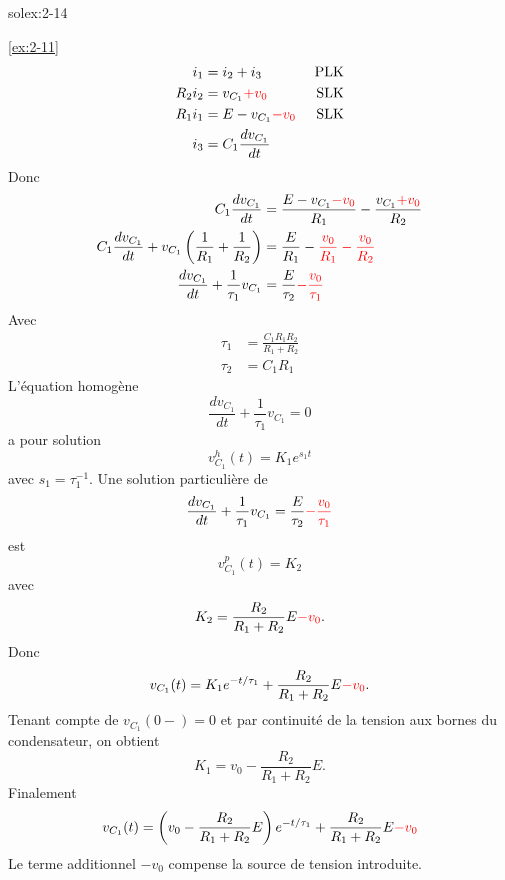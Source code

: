 \begin{exwithsol}{solex:2-14}
\begin{solexercise}{\ref{ex:2-11}}
\begin{align}
i_1 &= i_2 + i_3 &\text{ PLK}\\
R_2 i_2 &= v_{C_1} \textcolor{red}{+ v_0} &\text{ SLK}\\
R_1 i_1 &= E - v_{C_1} \textcolor{red}{- v_0} &\text{ SLK}\\
i_3 &= C_1 \frac{dv_{C_1}}{dt}
\end{align}
Donc 
\begin{align}
C_1 \frac{dv_{C_1}}{dt} &= \frac{E - v_{C_1} \textcolor{red}{- v_0}}{R_1} - \frac{v_{C_1}\textcolor{red}{+v_0}}{R_2} \\
C_1 \frac{dv_{C_1}}{dt} + v_{C_1} \left(\frac{1}{R_1}+\frac{1}{R_2}\right)&= \frac{E}{R_1} - \textcolor{red}{\frac{v_0}{R_1} - \frac{v_0}{R_2}}\\
\frac{dv_{C_1}}{dt} + \frac{1}{\tau_1} v_{C_1} &= \frac{E}{\tau_2} \textcolor{red}{- \frac{v_0}{\tau_1}}
\end{align} 
Avec
\begin{align}
\tau_1 &= \frac{C_1R_1R_2}{R_1+R_2}\\
\tau_2 &= C_1R_1
\end{align}
L'\'equation homog\`ene 
$$\frac{dv_{C_1}}{dt} + \frac{1}{\tau_1} v_{C_1} = 0$$
a pour solution
$$v_{C_1}^h(t) = K_1 e^{s_1t}$$
avec $s_1 = \tau_1^{-1}$.
Une solution particuli\`ere de 
$$\frac{dv_{C_1}}{dt} + \frac{1}{\tau_1} v_{C_1} = \frac{E}{\tau_2} \textcolor{red}{- \frac{v_0}{\tau_1}}$$
est 
$$v_{C_1}^p(t) = K_2$$
avec $$K_2 = \frac{R_2}{R_1+R_2} E  \textcolor{red}{- v_0}.$$
Donc 
$$ v_{C_1}(t) = K_1 e^{-t/\tau_1} + \frac{R_2}{R_1+R_2} E \textcolor{red}{- v_0}.$$ 
Tenant compte de $v_{C_1}(0-) = 0$ et par continuit\'e de la tension aux bornes du condensateur, on obtient $$K_1 = v_0 - \frac{R_2}{R_1+R_2} E.$$
Finalement 
$$ v_{C_1}(t) = \left(v_0 - \frac{R_2}{R_1+R_2} E\right) e^{-t/\tau_1} + \frac{R_2}{R_1+R_2} E \textcolor{red}{- v_0}$$
Le terme additionnel $- v_0$ compense la source de tension introduite.
\end{solexercise}


\end{exwithsol}
